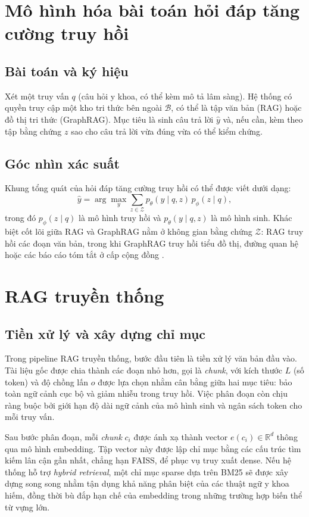 \documentclass[a4paper,12pt,twoside]{report}
\begin{document}
\section{Mô hình hóa bài toán hỏi đáp tăng cường truy hồi}
\subsection{Bài toán và ký hiệu}
Xét một truy vấn \(q\) (câu hỏi y khoa, có thể kèm mô tả lâm sàng). Hệ thống có quyền truy cập một kho tri thức bên ngoài \(\mathcal{B}\), có thể là tập văn bản (RAG) hoặc đồ thị tri thức (GraphRAG). Mục tiêu là sinh câu trả lời \(\hat{y}\) và, nếu cần, kèm theo tập bằng chứng \(z\) sao cho câu trả lời vừa đúng vừa có thể kiểm chứng.

\subsection{Góc nhìn xác suất}
Khung tổng quát của hỏi đáp tăng cường truy hồi có thể được viết dưới dạng:
\[
  \hat{y} = \arg\max_{y} \sum_{z \in \mathcal{Z}} p_{\theta}(y \mid q, z)\, p_{\phi}(z \mid q),
\]
trong đó \(p_{\phi}(z \mid q)\) là mô hình truy hồi và \(p_{\theta}(y \mid q, z)\) là mô hình sinh. Khác biệt cốt lõi giữa RAG và GraphRAG nằm ở không gian bằng chứng \(\mathcal{Z}\): RAG truy hồi các đoạn văn bản, trong khi GraphRAG truy hồi tiểu đồ thị, đường quan hệ hoặc các báo cáo tóm tắt ở cấp cộng đồng \cite{edge2024,wu2024}.

\section{RAG truyền thống}
\subsection{Tiền xử lý và xây dựng chỉ mục}
Trong pipeline RAG truyền thống, bước đầu tiên là tiền xử lý văn bản đầu vào. Tài liệu gốc được chia thành các đoạn nhỏ hơn, gọi là \textit{chunk}, với kích thước \(L\) (số token) và độ chồng lấn \(o\) được lựa chọn nhằm cân bằng giữa hai mục tiêu: bảo toàn ngữ cảnh cục bộ và giảm nhiễu trong truy hồi. Việc phân đoạn còn chịu ràng buộc bởi giới hạn độ dài ngữ cảnh của mô hình sinh và ngân sách token cho mỗi truy vấn.

Sau bước phân đoạn, mỗi \textit{chunk} \(c_i\) được ánh xạ thành vector \(e(c_i)\in\mathbb{R}^d\) thông qua mô hình embedding. Tập vector này được lập chỉ mục bằng các cấu trúc tìm kiếm lân cận gần nhất, chẳng hạn FAISS, để phục vụ truy xuất dense. Nếu hệ thống hỗ trợ \textit{hybrid retrieval}, một chỉ mục sparse dựa trên BM25 sẽ được xây dựng song song nhằm tận dụng khả năng phân biệt của các thuật ngữ y khoa hiếm, đồng thời bù đắp hạn chế của embedding trong những trường hợp biến thể từ vựng lớn.
\end{document}
